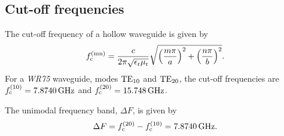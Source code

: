 \subsection{Cut-off frequencies}
The cut-off frequency of a hollow waveguide is given by
\begin{equation}
f_{\rm c}^{\rm (mn)} = \frac{c}{2 \pi \sqrt{\epsilon_{\rm r} \mu_{\rm r}}} \sqrt{\left(\frac{m \pi}{a}\right)^{\rm 2} + \left(\frac{n \pi}{b}\right)^{\rm 2}}.
\label{eq:cut-off-waveguide}
\end{equation}
For a \emph{WR75} waveguide, modes $\rm TE_{10}$ and $\rm TE_{20}$, the cut-off frequencies are $f_{\rm c}^{\rm (10)} = \SI{7.8740}{\giga\hertz}$ and $f_{\rm c}^{\rm (20)} = \SI{15.748}{\giga\hertz}$. \par
The unimodal frequency band, $\Delta F$, is given by
\begin{equation}
\Delta F = f_{\rm c}^{\rm (20)} - f_{\rm c}^{\rm (10)} = \SI{7.8740}{\giga\hertz}.
\end{equation}